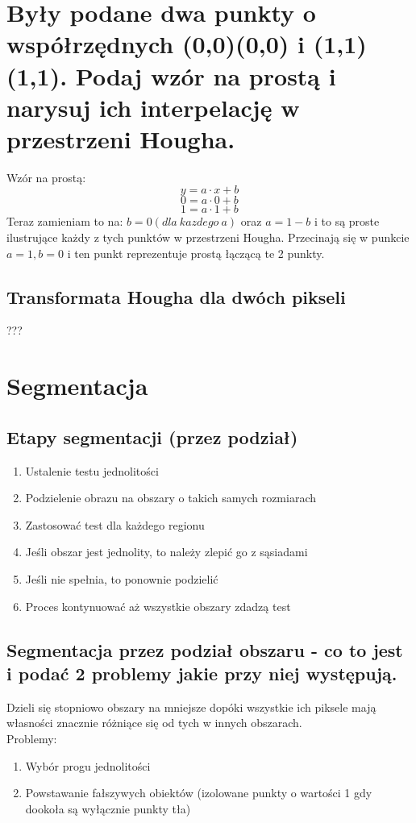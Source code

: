 \documentclass[a4paper, 12pt, titlepage]{article}
\begin{document}
\section{Były podane dwa punkty o współrzędnych (0,0)(0,0) i (1,1)(1,1). Podaj wzór na prostą i narysuj ich interpelację w przestrzeni Hougha.}
Wzór na prostą:
$$ y=a\cdot x+b $$
$$ 0=a\cdot 0+b $$
$$ 1=a\cdot 1+b $$
Teraz zamieniam to na: $b = 0 (dla~kazdego~a)$ oraz $a = 1 - b$ i to są proste ilustrujące każdy z tych punktów w przestrzeni Hougha. Przecinają się w punkcie $a = 1, b = 0$ i ten punkt reprezentuje prostą łączącą te 2 punkty.

\subsection{Transformata Hougha dla dwóch pikseli}
???

\pagebreak\section{Segmentacja}

\subsection{Etapy segmentacji (przez podział)}
\begin{enumerate}[noitemsep]
	\item Ustalenie testu jednolitości
	\item Podzielenie obrazu na obszary o takich samych rozmiarach
	\item Zastosować test dla każdego regionu
	\item Jeśli obszar jest jednolity, to należy zlepić go z sąsiadami
	\item Jeśli nie spełnia, to ponownie podzielić
	\item Proces kontynuować aż wszystkie obszary zdadzą test
\end{enumerate}


\subsection{Segmentacja przez podział obszaru - co to jest i podać 2 problemy jakie przy niej występują.}
Dzieli się stopniowo obszary na mniejsze dopóki wszystkie ich piksele mają własności znacznie różniące się od tych w innych obszarach.  \\
Problemy:
\begin{enumerate}[noitemsep]
	\item Wybór progu jednolitości
	\item Powstawanie fałszywych obiektów (izolowane punkty o wartości 1 gdy dookoła są wyłącznie punkty tła)
\end{enumerate}
\end{document}
